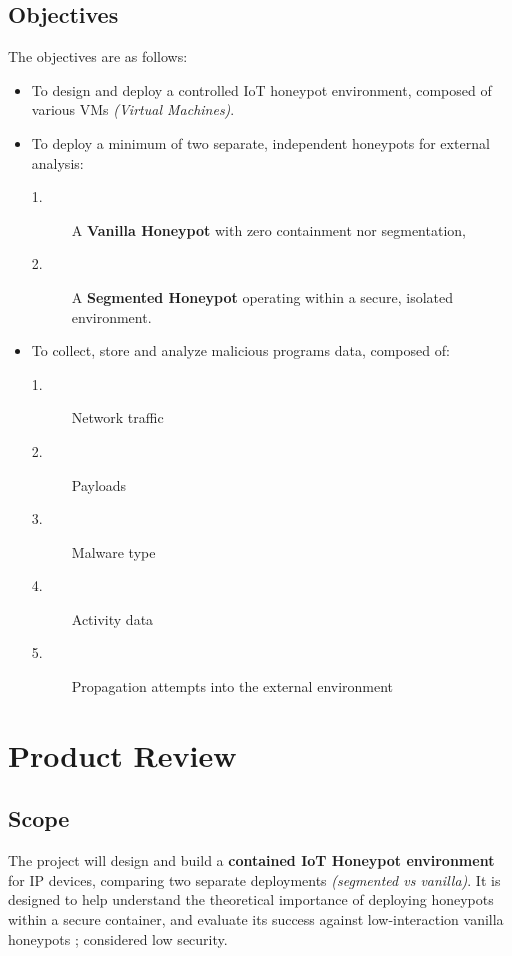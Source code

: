 \documentclass[a4paper,12pt,oneside]{book}			%
\begin{document}
\subsection{Objectives}\label{sec:objectives}
The objectives are as follows:
\begin{itemize}
	\item To design and deploy a controlled IoT honeypot environment, composed of various VMs \textit{(Virtual Machines)}.
	\item To deploy a minimum of two separate, independent honeypots for external analysis:
	\begin{description}
		\item[1.] A \textbf{Vanilla Honeypot} with zero containment nor segmentation,
		\item[2.] A \textbf{Segmented Honeypot} operating within a secure, isolated environment.
	\end{description}
	\item To collect, store and analyze malicious programs data, composed of:
	\begin{description}
		\item[1.] Network traffic
		\item[2.] Payloads
		\item[3.] Malware type
		\item[4.] Activity data
		\item[5.] Propagation attempts into the external environment
	\end{description}

		
\end{itemize}

\section{Product Review}\label{sec:productReview}

\subsection{Scope}\label{sec:scope}

The project will design and build a \textbf{contained IoT Honeypot environment} for IP devices, comparing two separate deployments \textit{(segmented vs vanilla)}. It is designed to help understand the theoretical importance of deploying honeypots within a secure container, and evaluate its success against low-interaction vanilla honeypots \citep{Kocaogullar2023honeypots}; considered low security.
\end{document}
